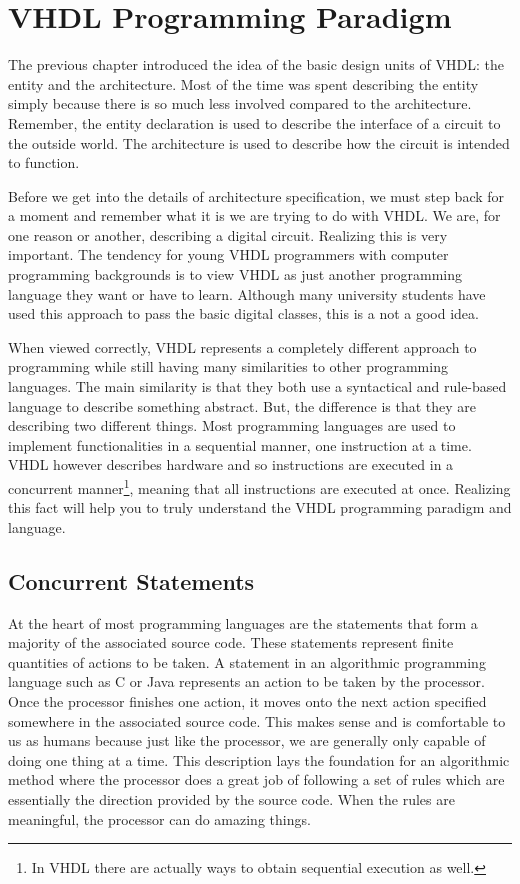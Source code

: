 %
%
%
\chapter{VHDL Programming Paradigm}
The previous chapter introduced the idea of the basic design units of VHDL: the entity and the architecture. Most of the time was spent describing the entity simply because there is so much less involved compared to the architecture. Remember, the entity declaration is used to describe the interface of a circuit to the outside world. The architecture is used to describe how the circuit is intended to function.

Before we get into the details of architecture specification, we must step back for a moment and remember what it is we are trying to do with VHDL. We are, for one reason or another, describing a digital circuit. Realizing this is very important. The tendency for young VHDL programmers with computer programming backgrounds is to view VHDL as just another programming language they want or have to learn. Although many university students have used this approach to pass the basic digital classes, this is a not a good idea. 

When viewed correctly, VHDL represents a completely different approach to programming while still having many similarities to other programming languages. The main similarity is that they both use a syntactical and rule-based language to describe something abstract. But, the difference is that they are describing two different things. Most programming languages are used to implement functionalities in a sequential manner, one instruction at a time. VHDL however describes hardware and so instructions are executed in a concurrent manner\footnote{In VHDL there are actually ways to obtain sequential execution as well.}, meaning that all instructions are executed at once. Realizing this fact will help you to truly understand the VHDL programming paradigm and language.

\section{Concurrent Statements}
At the heart of most programming languages are the statements that form a majority of the associated source code. These statements represent finite quantities of actions to be taken. A statement in an algorithmic programming language such as C or Java represents an action to be taken by the processor. Once the processor finishes one action, it moves onto the next action specified somewhere in the associated source code. This makes sense and is comfortable to us as humans because just like the processor, we are generally only capable of doing one thing at a time. This description lays the foundation for an algorithmic method where the processor does a great job of following a set of rules which are essentially the direction provided by the source code. When the rules are meaningful, the processor can do amazing things. 

